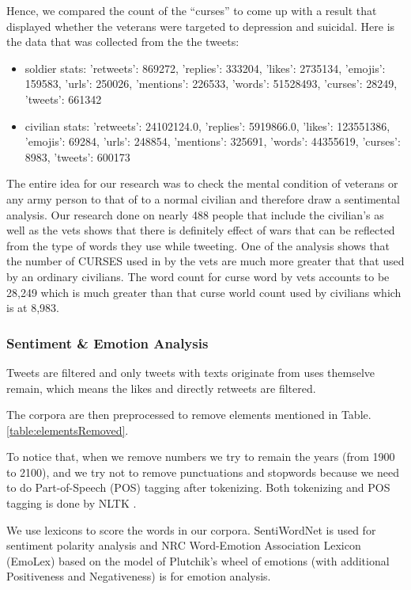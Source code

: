 Hence, we compared the count of the “curses” to come up with a result that displayed whether the veterans were targeted to depression and suicidal. Here is the data that was collected from the the tweets:

\begin{itemize}
  \item soldier stats: {'retweets': 869272, 'replies': 333204, 'likes': 2735134, 'emojis': 159583, 'urls': 250026, 'mentions': 226533, 'words': 51528493, 'curses': 28249, 'tweets': 661342}
  \item civilian stats: {'retweets': 24102124.0, 'replies': 5919866.0, 'likes': 123551386, 'emojis': 69284, 'urls': 248854, 'mentions': 325691, 'words': 44355619, 'curses': 8983, 'tweets': 600173}
\end{itemize}

The entire idea for our research was to check the mental condition of veterans or any army person to that of to a normal civilian and therefore draw a sentimental analysis. Our research done on nearly 488 people that include the civilian’s as well as the vets shows that there is definitely effect of wars that can be reflected from the type of words they use while tweeting. One of the analysis shows that the number of CURSES used in by the vets are much more greater that that used by an ordinary civilians. The word count for curse word by vets accounts to be 28,249 which is much greater than that curse world count used by civilians which is at 8,983.

\subsubsection{Sentiment \& Emotion Analysis}

Tweets are filtered and only tweets with texts originate from uses themselve remain, which means the likes and directly retweets are filtered.

The corpora are then preprocessed to remove elements mentioned in Table.\ref{table:elementsRemoved}.

To notice that, when we remove numbers we try to remain the years (from 1900 to 2100), and we try not to remove punctuations and stopwords because we need to do Part-of-Speech (POS) tagging after tokenizing. Both tokenizing and POS tagging is done by NLTK \citep{NLTK}.

We use lexicons to score the words in our corpora. SentiWordNet is used for sentiment polarity analysis and NRC Word-Emotion Association Lexicon (EmoLex) \citep{Mohammad13} based on the model of Plutchik’s wheel of emotions \citep{plutchik2003emotions} (with additional Positiveness and Negativeness) is for emotion analysis.

